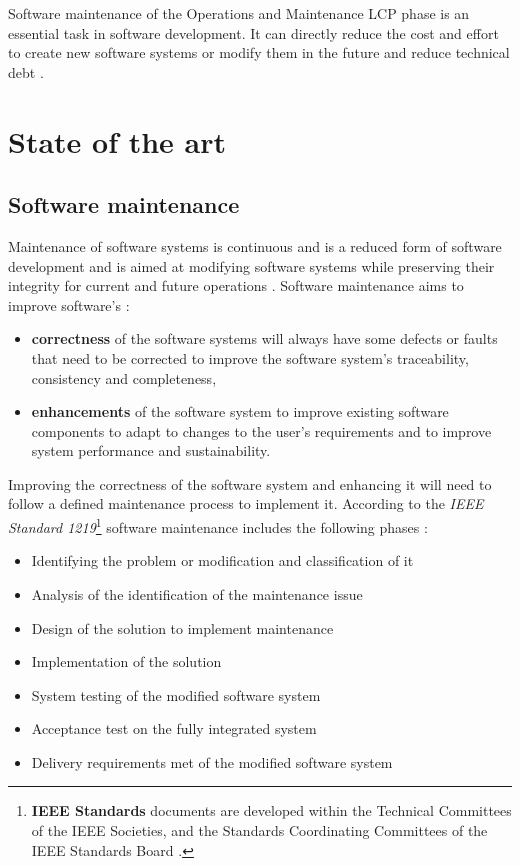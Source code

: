 Software maintenance of the Operations and Maintenance LCP phase is an essential task in software development. It can directly reduce the cost and effort to create new software systems or modify them in the future and reduce technical debt \cite{Thamburaj2017, DeLeon-Sigg2020}. 

\clearpage

\section{State of the art}

\subsection{Software maintenance}\label{sec:ch1_softwareMaintenanceIntro}{}
Maintenance of software systems is continuous and is a reduced form of software development and is aimed at modifying software systems while preserving their integrity for current and future operations \cite{Sneed2004, Ackermann2009, Port2017}. Software maintenance aims to improve software's \cite{Mamone1994}:

\begin{itemize}
	\item \textbf{correctness} of the software systems will always have some defects or faults that need to be corrected to improve the software system's traceability, consistency and completeness,
	\item \textbf{enhancements} of the software system to improve existing software components to adapt to changes to the user's requirements and to improve system performance and sustainability. 
\end{itemize}

Improving the correctness of the software system and enhancing it will need to follow a defined maintenance process to implement it. According to the \textit{IEEE Standard 1219}\footnote{\textbf{IEEE Standards} documents are developed within the Technical Committees of the IEEE Societies, and the Standards Coordinating Committees of the IEEE Standards Board \cite{Mamone1994}.} software maintenance includes the following phases \cite{Mamone1994, Hasan2012}:
\begin{itemize}
	\item Identifying the problem or modification and classification of it
	\item Analysis of the identification of the maintenance issue
	\item Design of the solution to implement maintenance
	\item Implementation of the solution
	\item System testing of the modified software system
	\item Acceptance test on the fully integrated system
	\item Delivery requirements met of the modified software system
\end{itemize}

